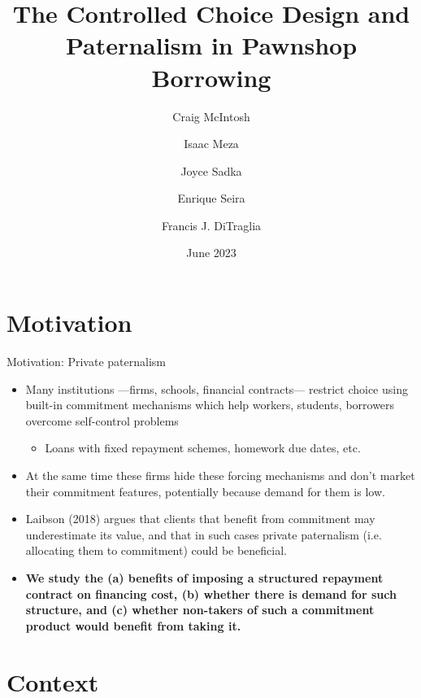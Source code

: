 \documentclass[8pt]{beamer}
\title{The Controlled Choice Design and Paternalism in Pawnshop Borrowing}
\author{Craig McIntosh\inst{1} \and Isaac Meza\inst{2} \and Joyce Sadka\inst{3} \and Enrique Seira\inst{4} \and Francis J. DiTraglia\inst{5} }
\institute[UTran]{\inst{1} UCSD, \inst{2} Harvard , \inst{3} ITAM , \inst{4} MSU , \inst{5} Oxford}
\date{June 2023}
\begin{document}
\begin{frame}[c, noframenumbering]%
\titlepage
\end{frame}


\section{Motivation}



\begin{frame}{Motivation: Private paternalism}
\begin{itemize}
    \vfill \item Many institutions —firms, schools, financial contracts— restrict choice using built-in commitment mechanisms which help workers, students, borrowers overcome self-control problems
    \begin{itemize}
        \item Loans with fixed repayment schemes, homework due dates, etc.
    \end{itemize}
    \vfill \pause\item At the same time these firms hide these forcing mechanisms and don’t market their commitment features, potentially because demand for them is low.
    \vfill  \item  Laibson (2018) argues that clients that benefit from commitment may underestimate its value, and that in such cases private paternalism (i.e. allocating them to commitment) could be beneficial.
    \vfill  \pause\item  \textbf{We study the (a) benefits of imposing a structured repayment contract on financing cost, (b) whether there is demand for such structure, and (c) whether non-takers of such a commitment product would benefit from taking it.}
\end{itemize}

\end{frame}



\section{Context}
\end{document}
